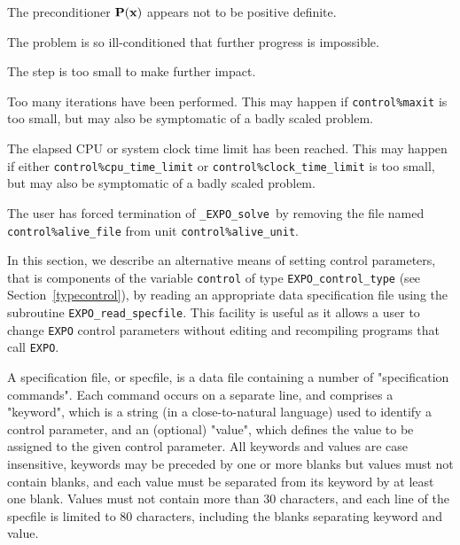 \documentclass{galahad}
\newcommand{\packagename}{EXPO}
\newcommand{\fullpackagename}{\libraryname\_\packagename}
\newcommand{\solver}{{\tt \fullpackagename\_solve}}
\begin{document}
\begin{description}
 The preconditioner ${\mathbf{P}}({\mathbf{x}})$ appears not to
  be positive definite.

 The problem is so ill-conditioned that
  further progress is impossible.

 The step is too small to make further impact.

 Too many iterations have been performed.
  This may happen if
    {\tt control\%maxit} is too small, but may also be symptomatic of
    a badly scaled problem.

 The elapsed CPU or system clock time limit has been
    reached. This may happen if either {\tt control\%cpu\_time\_limit} or
    {\tt control\%clock\_time\_limit} is too small, but may also be symptomatic
    of a badly scaled problem.

 The user has forced termination of \solver\
     by removing the file named {\tt control\%a\-live\_file} from
     unit {\tt control\%alive\_unit}.

\end{description}


\galfeatures
\noindent In this section, we describe an alternative means of setting
control parameters, that is components of the variable {\tt control} of type
{\tt \packagename\_control\_type}
(see Section~\ref{typecontrol}),
by reading an appropriate data specification file using the
subroutine {\tt \packagename\_read\_specfile}. This facility
is useful as it allows a user to change  {\tt \packagename} control parameters
without editing and recompiling programs that call {\tt \packagename}.

A specification file, or specfile, is a data file containing a number of
"specification commands". Each command occurs on a separate line,
and comprises a "keyword",
which is a string (in a close-to-natural language) used to identify a
control parameter, and
an (optional) "value", which defines the value to be assigned to the given
control parameter. All keywords and values are case insensitive,
keywords may be preceded by one or more blanks but
values must not contain blanks, and
each value must be separated from its keyword by at least one blank.
Values must not contain more than 30 characters, and
each line of the specfile is limited to 80 characters,
including the blanks separating keyword and value.
\end{document}
